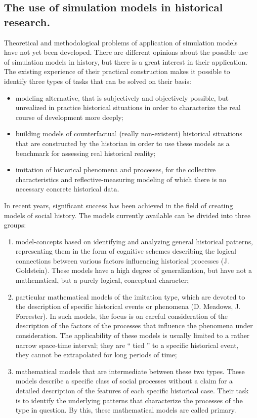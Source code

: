 \documentclass[12pt]{report}
\theoremstyle{definition}
\providecommand{\tightlist}{%
	\setlength{\itemsep}{0pt}\setlength{\parskip}{0pt}}
\begin{document}
\subsection{The use of simulation models in historical research.}

Theoretical and methodological problems of application of simulation models have not yet been developed.
There are different opinions about the possible use of simulation models in history, but there is a great interest in their application.
The existing experience of their practical construction makes it possible to identify three types of tasks that can be solved on their basis:

\begin{itemize}
	\tightlist
	\item modeling alternative, that is subjectively and objectively possible, but unrealized in practice historical situations in order to characterize the real course of development more deeply;
	\item building models of counterfactual (really non-existent) historical situations that are constructed by the historian in order to use these models as a benchmark for assessing real historical reality;
	\item imitation of historical phenomena and processes, for the collective characteristics and reflective-measuring modeling of which there is no necessary concrete historical data.
\end{itemize}

In recent years, significant success has been achieved in the field of creating models of social history.
The models currently available can be divided into three groups:

\begin{enumerate}
	\tightlist
	\item model-concepts based on identifying and analyzing general historical patterns, representing them in the form of cognitive schemes describing the logical connections between various factors influencing historical processes (J. Goldstein).
	These models have a high degree of generalization, but have not a mathematical, but a purely logical, conceptual character;
	\item particular mathematical models of the imitation type, which are devoted to the description of specific historical events or phenomena (D. Meadows, J. Forrester).
	In such models, the focus is on careful consideration of the description of the factors of the processes that influence the phenomena under consideration.
	The applicability of these models is usually limited to a rather narrow space-time interval; they are `` tied '' to a specific historical event, they cannot be extrapolated for long periods of time;
	\item mathematical models that are intermediate between these two types.
	These models describe a specific class of social processes without a claim for a detailed description of the features of each specific historical case.
	Their task is to identify the underlying patterns that characterize the processes of the type in question.
	By this, these mathematical models are called primary. 
\end{enumerate}
\end{document}
